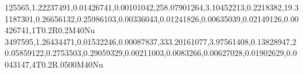125565,1.22237491,0.01426741,0.00101042,258.07901264,3.10452213,0.2218382,19.31187301,0.26656132,0.25986103,0.00336043,0.01241826,0.00635039,0.02149126,0.00426741,1T0.2R0.2M40Nu
3497595,1.26434471,0.01532246,0.00087837,333.20161077,3.97561408,0.13828947,20.05859122,0.2753503,0.29059329,0.00211003,0.0083266,0.00627028,0.01902629,0.0043147,4T0.2R.0500M40Nu
